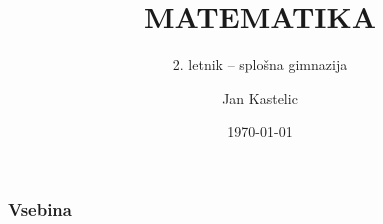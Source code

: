 \documentclass[1pt, aspectratio=169,t]{beamer}
\title{MATEMATIKA}
\subtitle{2. letnik -- splošna gimnazija}
\date{\today}
\author{Jan Kastelic}
\institute[GAA]{Gimnazija Antona Aškerca, \\ Šolski center Ljubljana}
\begin{document}
\begin{frame}
	\titlepage
\end{frame}
	

\begin{frame}
	\frametitle{Vsebina}
	\tableofcontents[hideallsubsections]
\end{frame}
	
% 
% 
% 

% 
% 
% 
% 
% 
% 
% 
\end{document}
